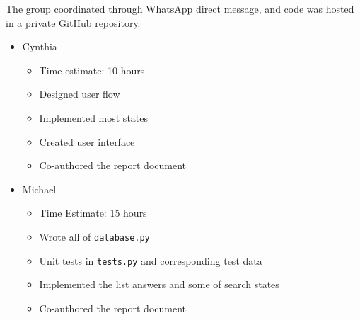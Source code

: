 \documentclass{article}
\begin{document}
The group coordinated through WhatsApp direct message, and code was hosted in a private GitHub repository.

\begin{itemize}
    \item Cynthia
          \begin{itemize}
              \item Time estimate: 10 hours
              \item Designed user flow
              \item Implemented most states
              \item Created user interface
              \item Co-authored the report document
          \end{itemize}
    \item Michael
          \begin{itemize}
              \item Time Estimate: 15 hours
              \item Wrote all of \verb|database.py|
              \item Unit tests in \verb|tests.py| and corresponding test data
              \item Implemented the list answers and some of search states
              \item Co-authored the report document
          \end{itemize}
\end{itemize}
\end{document}
